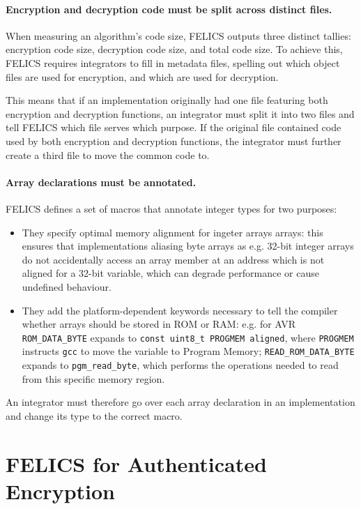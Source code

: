 \documentclass{article}
\begin{document}
\paragraph{Encryption and decryption code must be split across
  distinct files.}  When measuring an algorithm's code size, FELICS
outputs three distinct tallies: encryption code size, decryption code
size, and total code size.  To achieve this, FELICS requires
integrators to fill in metadata files, spelling out which object files
are used for encryption, and which are used for decryption.

This means that if an implementation originally had one file featuring
both encryption and decryption functions, an integrator must split it
into two files and tell FELICS which file serves which purpose.  If
the original file contained code used by both encryption and
decryption functions, the integrator must further create a third file
to move the common code to.

\paragraph{Array declarations must be annotated.}  FELICS defines a
set of macros that annotate integer types for two purposes:

\begin{itemize}
\item They specify optimal memory alignment for ingeter arrays arrays:
  this ensures that implementations aliasing byte arrays as
  e.g. 32-bit integer arrays do not accidentally access an array
  member at an address which is not aligned for a 32-bit variable,
  which can degrade performance or cause undefined behaviour.

\item They add the platform-dependent keywords necessary to tell the
  compiler whether arrays should be stored in ROM or RAM: e.g. for AVR
  \texttt{ROM\_DATA\_BYTE} expands to \texttt{const uint8\_t PROGMEM
    aligned}, where \texttt{PROGMEM} instructs \texttt{gcc} to move
  the variable to Program Memory; \texttt{READ\_ROM\_DATA\_BYTE}
  expands to \texttt{pgm\_read\_byte}, which performs the operations
  needed to read from this specific memory region.
\end{itemize}

An integrator must therefore go over each array declaration in an
implementation and change its type to the correct macro.

\section{FELICS for Authenticated Encryption}
\label{sec:felics-ae}
\end{document}
